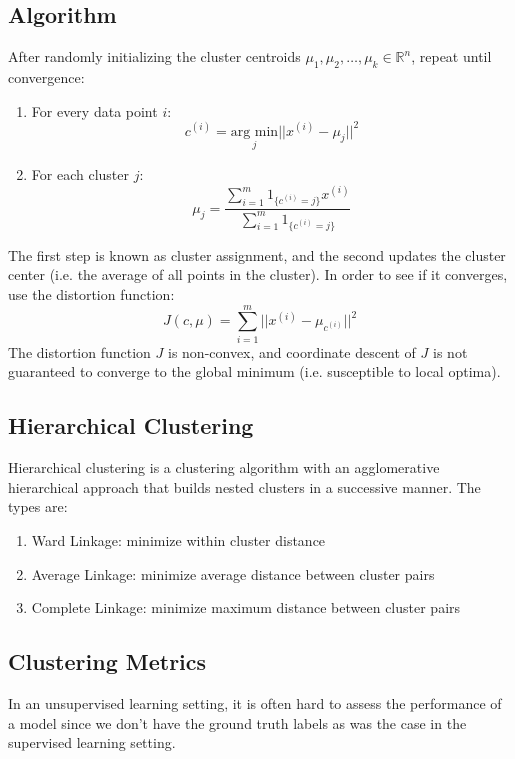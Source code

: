 \documentclass[twoside,twocolumn]{article}
\begin{document}
\subsection{Algorithm}
After randomly initializing the cluster centroids
$\mu_1, \mu_2, \hdots, \mu_k \in \mathbb{R}^n$, repeat until convergence:
\begin{enumerate}
  \item For every data point $i$:
    \begin{equation}
      c^{(i)}=\underset{j}{\textrm{arg min}}||x^{(i)}-\mu_j||^2
    \end{equation}
  \item For each cluster $j$:
    \begin{equation}
      \mu_j=\frac{\displaystyle\sum_{i=1}^m1_{\{c^{(i)}=j\}}x^{(i)}}{\displaystyle\sum_{i=1}^m1_{\{c^{(i)}=j\}}}
    \end{equation}
\end{enumerate}
The first step is known as cluster assignment, and the second updates the
cluster center (i.e. the average of all points in the cluster). In order to
see if it converges, use the distortion function:
\begin{equation}
  J(c,\mu)=\sum_{i=1}^m||x^{(i)}-\mu_{c^{(i)}}||^2
\end{equation}
The distortion function $J$ is non-convex, and coordinate descent of $J$ is not
guaranteed to converge to the global minimum (i.e. susceptible to local optima).
\subsection{Hierarchical Clustering}
Hierarchical clustering is a clustering algorithm with an agglomerative
hierarchical approach that builds nested clusters in a successive manner. The
types are:
\begin{enumerate}
  \item Ward Linkage: minimize within cluster distance
  \item Average Linkage: minimize average distance between cluster pairs
  \item Complete Linkage: minimize maximum distance between cluster pairs
\end{enumerate}
\subsection{Clustering Metrics}
In an unsupervised learning setting, it is often hard to assess the
performance of a model since we don't have the ground truth labels as was
the case in the supervised learning setting.
\end{document}
